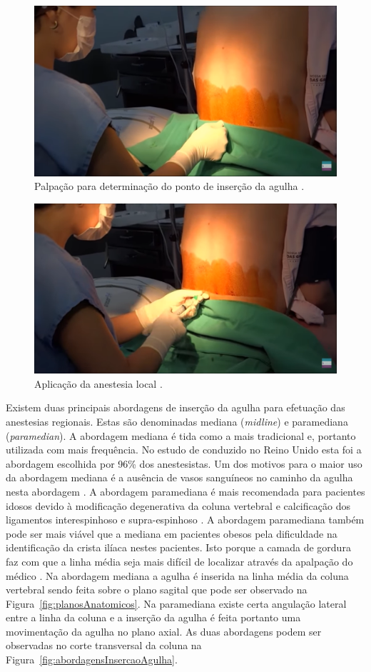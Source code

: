 \begin{figure}[ht!]
    \centering
    \includegraphics[width=0.6\linewidth]{capitulos/figuras/0.marcacaoPonto.png}
    \caption{Palpação para determinação do ponto de inserção da agulha \cite{Londero2018}.}
    \label{fig:marcacaoPonto}
\end{figure}

\begin{figure}[ht!]
    \centering
    \includegraphics[width=0.6\linewidth]{capitulos/figuras/1.AnestesiaLocal.png}
    \caption{Aplicação da anestesia local \cite{Londero2018}.}
    \label{fig:anestesiaLocal}
\end{figure}

Existem duas principais abordagens de inserção da agulha para efetuação das anestesias regionais. Estas são denominadas mediana (\textit{midline}) e paramediana (\textit{paramedian}). A abordagem mediana é tida como a mais tradicional e, portanto  utilizada com mais frequência. No estudo de \textcite{Wantman2006} conduzido no Reino Unido esta foi a abordagem escolhida por 96\% dos anestesistas. Um dos motivos para o maior uso da abordagem mediana é a ausência de vasos sanguíneos no caminho da agulha nesta abordagem \cite{Bapat2015}. A abordagem paramediana é mais recomendada para pacientes idosos \cite{Ahsan-ul-Haq2005} devido à modificação degenerativa da coluna vertebral \cite{Boon2003} e calcificação dos ligamentos interespinhoso e supra-espinhoso \cite{Wantman2006}. A abordagem paramediana também pode ser mais viável que a mediana em pacientes obesos pela dificuldade na identificação da crista ilíaca nestes pacientes. Isto porque a camada de gordura faz com que a linha média seja mais difícil de localizar através da apalpação do médico \cite{N.2013}. Na abordagem mediana a agulha é inserida na linha média da coluna vertebral sendo feita sobre o plano sagital que pode ser observado na Figura~\ref{fig:planosAnatomicos}. Na paramediana existe certa angulação lateral entre a linha da coluna e a inserção da agulha é feita portanto uma movimentação da agulha no plano axial. As duas abordagens podem ser observadas no corte transversal da coluna na Figura~\ref{fig:abordagensInsercaoAgulha}. 

